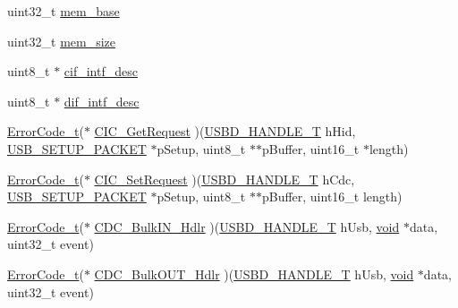 \begin{DoxyCompactItemize}
\item 
uint32\-\_\-t \hyperlink{structUSBD__CDC__INIT__PARAM_a2d9d28e9450cf152c1826a3669015014}{mem\-\_\-base}
\item 
uint32\-\_\-t \hyperlink{structUSBD__CDC__INIT__PARAM_a3616334a22f3ae9a30029f572920b9f4}{mem\-\_\-size}
\item 
uint8\-\_\-t $\ast$ \hyperlink{structUSBD__CDC__INIT__PARAM_a84c3d40976a44e3dde322e98480776a3}{cif\-\_\-intf\-\_\-desc}
\item 
uint8\-\_\-t $\ast$ \hyperlink{structUSBD__CDC__INIT__PARAM_a473ac609a0fe0a78826b20a947de7df1}{dif\-\_\-intf\-\_\-desc}
\item 
\hyperlink{error_8h_a905255056c349318139d94aa4523d516}{Error\-Code\-\_\-t}($\ast$ \hyperlink{structUSBD__CDC__INIT__PARAM_ae410e35b0595212ed55e3f5873fe1434}{C\-I\-C\-\_\-\-Get\-Request} )(\hyperlink{group__USBD__Core_gafdbb2204d929cb9d75736bd2b42342ac}{U\-S\-B\-D\-\_\-\-H\-A\-N\-D\-L\-E\-\_\-\-T} h\-Hid, \hyperlink{group__USBD__Core_ga4a940f7627cc7e9f0bb693cc0fce8637}{U\-S\-B\-\_\-\-S\-E\-T\-U\-P\-\_\-\-P\-A\-C\-K\-E\-T} $\ast$p\-Setup, uint8\-\_\-t $\ast$$\ast$p\-Buffer, uint16\-\_\-t $\ast$length)
\item 
\hyperlink{error_8h_a905255056c349318139d94aa4523d516}{Error\-Code\-\_\-t}($\ast$ \hyperlink{structUSBD__CDC__INIT__PARAM_ad652c18e5d5f62c326e5e67ea5615ae0}{C\-I\-C\-\_\-\-Set\-Request} )(\hyperlink{group__USBD__Core_gafdbb2204d929cb9d75736bd2b42342ac}{U\-S\-B\-D\-\_\-\-H\-A\-N\-D\-L\-E\-\_\-\-T} h\-Cdc, \hyperlink{group__USBD__Core_ga4a940f7627cc7e9f0bb693cc0fce8637}{U\-S\-B\-\_\-\-S\-E\-T\-U\-P\-\_\-\-P\-A\-C\-K\-E\-T} $\ast$p\-Setup, uint8\-\_\-t $\ast$$\ast$p\-Buffer, uint16\-\_\-t length)
\item 
\hyperlink{error_8h_a905255056c349318139d94aa4523d516}{Error\-Code\-\_\-t}($\ast$ \hyperlink{structUSBD__CDC__INIT__PARAM_a08968a08057d62bc39ba89d193c85ed2}{C\-D\-C\-\_\-\-Bulk\-I\-N\-\_\-\-Hdlr} )(\hyperlink{group__USBD__Core_gafdbb2204d929cb9d75736bd2b42342ac}{U\-S\-B\-D\-\_\-\-H\-A\-N\-D\-L\-E\-\_\-\-T} h\-Usb, \hyperlink{Paradigm_2Tern__EE_2small_2portmacro_8h_a14d32f8130d3c0b212cfc751730b5b49}{void} $\ast$data, uint32\-\_\-t event)
\item 
\hyperlink{error_8h_a905255056c349318139d94aa4523d516}{Error\-Code\-\_\-t}($\ast$ \hyperlink{structUSBD__CDC__INIT__PARAM_a3860a8bc7d17161e1b85d44370cc0b25}{C\-D\-C\-\_\-\-Bulk\-O\-U\-T\-\_\-\-Hdlr} )(\hyperlink{group__USBD__Core_gafdbb2204d929cb9d75736bd2b42342ac}{U\-S\-B\-D\-\_\-\-H\-A\-N\-D\-L\-E\-\_\-\-T} h\-Usb, \hyperlink{Paradigm_2Tern__EE_2small_2portmacro_8h_a14d32f8130d3c0b212cfc751730b5b49}{void} $\ast$data, uint32\-\_\-t event)

\end{DoxyCompactItemize}
